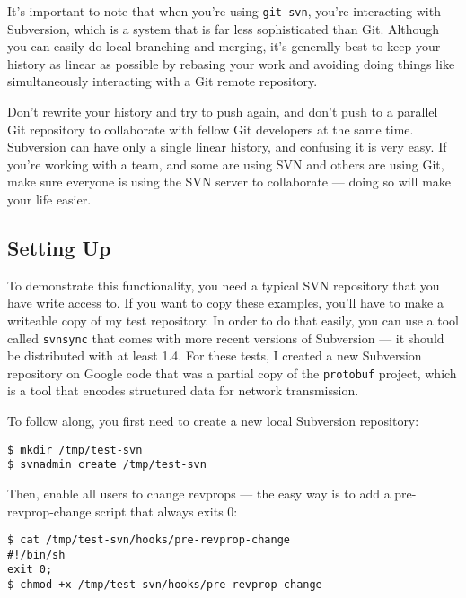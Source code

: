 \documentclass[a4paper]{book}
\begin{document}
It's important to note that when you're using \texttt{git svn}, you're interacting with Subversion, which is a system that is far less sophisticated than Git. Although you can easily do local branching and merging, it's generally best to keep your history as linear as possible by rebasing your work and avoiding doing things like simultaneously interacting with a Git remote repository.

Don't rewrite your history and try to push again, and don't push to a parallel Git repository to collaborate with fellow Git developers at the same time. Subversion can have only a single linear history, and confusing it is very easy. If you're working with a team, and some are using SVN and others are using Git, make sure everyone is using the SVN server to collaborate --- doing so will make your life easier.

\subsection{Setting Up}\label{setting-up}

To demonstrate this functionality, you need a typical SVN repository that you have write access to. If you want to copy these examples, you'll have to make a writeable copy of my test repository. In order to do that easily, you can use a tool called \texttt{svnsync} that comes with more recent versions of Subversion --- it should be distributed with at least 1.4. For these tests, I created a new Subversion repository on Google code that was a partial copy of the \texttt{protobuf} project, which is a tool that encodes structured data for network transmission.

To follow along, you first need to create a new local Subversion repository:

\begin{shaded}\begin{verbatim}
$ mkdir /tmp/test-svn
$ svnadmin create /tmp/test-svn
\end{verbatim}\end{shaded}

Then, enable all users to change revprops --- the easy way is to add a pre-revprop-change script that always exits 0:

\begin{shaded}\begin{verbatim}
$ cat /tmp/test-svn/hooks/pre-revprop-change
#!/bin/sh
exit 0;
$ chmod +x /tmp/test-svn/hooks/pre-revprop-change
\end{verbatim}\end{shaded}
\end{document}
